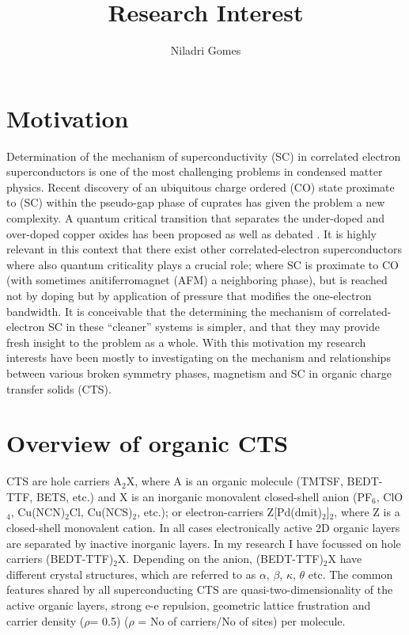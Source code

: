 \documentclass[a4paper,12pt]{article}
\title{\vspace{-2cm}Research Interest}
\author{Niladri Gomes}
\begin{document}
\maketitle



\section{Motivation}
Determination of the mechanism of superconductivity (SC) in correlated electron superconductors is one of the most challenging 
problems in condensed matter physics. Recent discovery of an ubiquitous charge ordered (CO) state proximate to (SC) within the 
pseudo-gap phase of cuprates \cite{ghiringhelli12a,chang12a,comin14a,wu13a} has given the problem a new complexity. A quantum critical
transition that separates the under-doped and over-doped copper oxides has been proposed as well as debated \cite{anderson04a,lee06a,scalapino12a}. It is highly relevant in this context that there exist
other correlated-electron superconductors where also quantum criticality plays a crucial role; where SC is
proximate to CO (with sometimes anitiferromagnet (AFM) a neighboring phase), but is reached not by doping but by application
of pressure that modifies the one-electron bandwidth. It is conceivable that the
determining the mechanism of correlated-electron SC in these “cleaner” systems is simpler,
and that they may provide fresh insight to the problem as a whole. With this motivation my research interests have 
been mostly to investigating on the mechanism and relationships between various broken symmetry phases, 
magnetism and SC in organic charge transfer solids (CTS).  

\section{Overview of organic CTS}
CTS are hole carriers A$_{2}$X, where A is an organic molecule (TMTSF, BEDT-TTF, BETS, etc.) and X is
an inorganic monovalent closed-shell anion (PF$_{6}$, ClO$_{4}$, Cu(NCN)$_{2}$Cl, Cu(NCS)$_{2}$, etc.); or electron-carriers
Z[Pd(dmit)$_{2}$]$_{2}$, where Z is a closed-shell monovalent cation. In all cases electronically active 2D organic
layers are separated by inactive inorganic layers. In my research I have focussed on hole carriers (BEDT-TTF)$_{2}$X. Depending
on the anion, (BEDT-TTF)$_{2}$X have different crystal structures, which are referred to as $\alpha$, $\beta$, $\kappa$, $\theta$ etc. 
The common features shared by all superconducting CTS are quasi-two-dimensionality of
the active organic layers, strong e-e repulsion, geometric lattice frustration and carrier density ($\rho$= 0.5) ($\rho$ = No of carriers/No of sites)
 per molecule.
\end{document}
